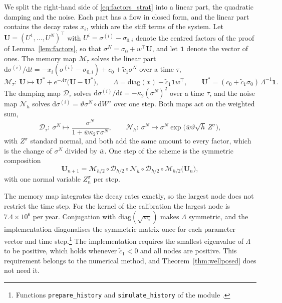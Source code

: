 \documentclass{rQUF2e}
\theoremstyle{plain}
\theoremstyle{definition}
\theoremstyle{remark}
\newcommand{\D}{\mathrm{d}}
\newcommand{\one}{\mathbf{1}}
\begin{document}
We split the right-hand side of \eqref{eq:factors_strat} into a linear part, the quadratic damping and the noise. Each part has a flow in closed form, and the linear part contains the decay rates $x_i$, which are the stiff terms of the system. Let $\boldsymbol U=(U^1,\dots,U^N)^\top$ with $U^i=\sigma^{(i)}-\sigma_{0,i}$ denote the centred factors of the proof of Lemma~\ref{lem:factors}, so that $\sigma^N=\sigma_0+w^\top\boldsymbol U$, and let $\one$ denote the vector of ones. The memory map $\mathcal{M}_\tau$ solves the linear part $\D\sigma^{(i)}/\D t=-x_i(\sigma^{(i)}-\sigma_{0,i})+c_0+\tilde c_1\sigma^N$ over a time $\tau$,
\begin{equation}\label{eq:memory_map}
\mathcal{M}_\tau:\ \boldsymbol U\mapsto\boldsymbol U^\ast+e^{-\Lambda\tau}\big(\boldsymbol U-\boldsymbol U^\ast\big),\qquad \Lambda=\mathrm{diag}(x)-\tilde c_1\one w^\top,\qquad \boldsymbol U^\ast=(c_0+\tilde c_1\sigma_0)\,\Lambda^{-1}\one .
\end{equation}
The damping map $\mathcal{D}_\tau$ solves $\D\sigma^{(i)}/\D t=-\kappa_2(\sigma^N)^2$ over a time $\tau$, and the noise map $\mathcal{N}_h$ solves $\D\sigma^{(i)}=\vartheta\sigma^N\circ\D W^\sigma$ over one step. Both maps act on the weighted sum,
\begin{equation}\label{eq:scalar_maps}
\mathcal{D}_\tau:\ \sigma^N\mapsto\frac{\sigma^N}{1+\bar w\kappa_2\tau\,\sigma^N},\qquad
\mathcal{N}_h:\ \sigma^N\mapsto\sigma^N\exp\big(\bar w\vartheta\sqrt h\,Z^\sigma\big),
\end{equation}
with $Z^\sigma$ standard normal, and both add the same amount to every factor, which is the change of $\sigma^N$ divided by $\bar w$. One step of the scheme is the symmetric composition
\begin{equation}\label{eq:scheme}
\boldsymbol U_{n+1}=\mathcal{M}_{h/2}\circ\mathcal{D}_{h/2}\circ\mathcal{N}_h\circ\mathcal{D}_{h/2}\circ\mathcal{M}_{h/2}\big(\boldsymbol U_n\big),
\end{equation}
with one normal variable $Z^\sigma_n$ per step.

The memory map integrates the decay rates exactly, so the largest node does not restrict the time step. For the kernel of the calibration the largest node is $7.4\times10^6$ per year. Conjugation with $\mathrm{diag}(\sqrt{w_i})$ makes $\Lambda$ symmetric, and the implementation diagonalises the symmetric matrix once for each parameter vector and time step.\footnote{Functions \texttt{prepare\_history} and \texttt{simulate\_history} of the module .} The implementation requires the smallest eigenvalue of $\Lambda$ to be positive, which holds whenever $\tilde c_1<0$ and all nodes are positive. This requirement belongs to the numerical method, and Theorem~\ref{thm:wellposed} does not need it.
\end{document}
